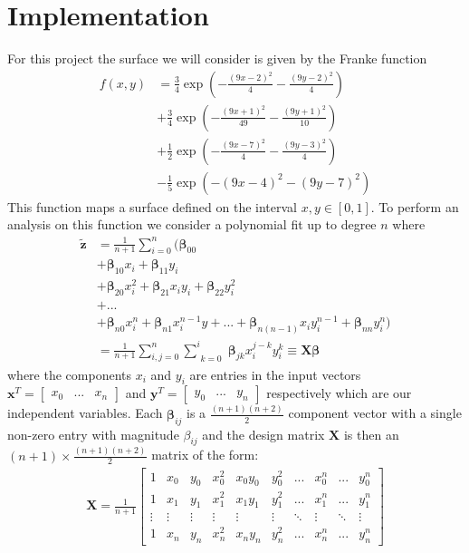 \documentclass[%
reprint,
amsmath,amssymb,
aps,
pra,
]{revtex4-2}
\newcommand{\f}[2]{\frac{#1}{#2}}
\begin{document}
\section{Implementation}
For this project the surface we will consider is given by the Franke function
\begin{align}
	f(x,y)&=\frac{3}{4}\exp(-\frac{(9x-2)^2}{4}-\frac{(9y-2)^2}{4})\nonumber\\
	&+\frac{3}{4}\exp(-\frac{(9x+1)^2}{49}-\frac{(9y+1)^2}{10})\nonumber\\
	&+\frac{1}{2}\exp(-\frac{(9x-7)^2}{4}-\frac{(9y-3)^2}{4})\nonumber\\
	&-\frac{1}{5}\exp(-(9x-4)^2-(9y-7)^2)
\end{align}
This function maps a surface defined on the interval $x,y\in[0,1]$. To perform an analysis on this function we consider a polynomial fit up to degree $n$ where
\begin{align}
	\tilde{\bm{z}}&=\f1{n+1}\sum_{i=0}^{n}\bigg(\bm\beta_{00}\label{eq:bmz}\\
	&+\bm\beta_{10}x_i+\bm\beta_{11}y_i\nonumber\\
	&+\bm\beta_{20}x_i^2+\bm\beta_{21}x_iy_i+\bm\beta_{22}y_i^2\nonumber\\
	&+...\nonumber\\
	&+\bm\beta_{n0}x_i^n+\bm\beta_{n1}x_i^{n-1}y+...+\bm\beta_{n(n-1)}x_iy_i^{n-1}+\bm\beta_{nn}y_i^n\bigg)\nonumber\\
	&=\frac{1}{n+1}\sum_{i,j=0}^{n}\sum_{\substack{k=0}}^{i}\bm\beta_{jk} x^{j-k}_i y^{k}_i\equiv \bm X\bm\beta\nonumber
\end{align}
where the components $x_i$ and $y_i$ are entries in the input vectors $\bm x^T=\begin{bmatrix} x_0&...&x_n \end{bmatrix}$ and $\bm y^T=\begin{bmatrix} y_0& ...&y_n \end{bmatrix}$ respectively which are our independent variables. Each $\bm\beta_{ij}$ is a $\frac{(n+1)(n+2)}{2}$ component vector with a single non-zero entry with magnitude $\beta_{ij}$ and the design matrix $\bm X$ is then an $(n+1)\times\frac{(n+1)(n+2)}{2}$ matrix of the form:
\begin{align*}
	\bm X=\frac{1}{n+1}\begin{bmatrix}
		1 & x_0 & y_0 & x^2_0 & x_0y_0 & y_0^2 & ... & x_0^n & ... & y_0^n\\
		1 & x_1 & y_1 & x_1^2 & x_1y_1 & y_1^2 & ... & x_1^n & ... & y_1^n\\
		\vdots & \vdots & \vdots & \vdots & \vdots & \vdots & \ddots & \vdots & \ddots & \vdots\\
		1 & x_n & y_n & x_n^2 & x_ny_n & y_n^2 & ... & x_n^n & ... & y_n^n
	\end{bmatrix}
\end{align*}
\end{document}
